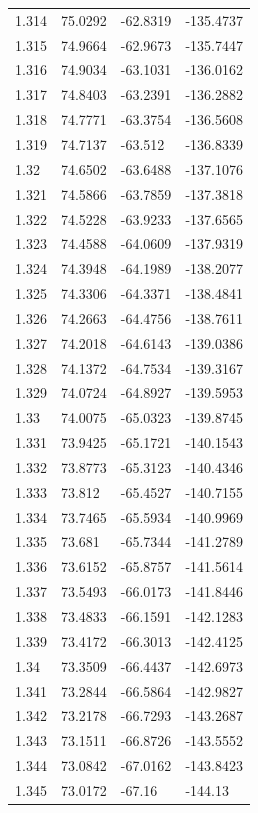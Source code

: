 \begin{tabular}{llll}
1.314 & 75.0292 & -62.8319 & -135.4737 \\
1.315 & 74.9664 & -62.9673 & -135.7447 \\
1.316 & 74.9034 & -63.1031 & -136.0162 \\
1.317 & 74.8403 & -63.2391 & -136.2882 \\
1.318 & 74.7771 & -63.3754 & -136.5608 \\
1.319 & 74.7137 & -63.512 & -136.8339 \\
1.32 & 74.6502 & -63.6488 & -137.1076 \\
1.321 & 74.5866 & -63.7859 & -137.3818 \\
1.322 & 74.5228 & -63.9233 & -137.6565 \\
1.323 & 74.4588 & -64.0609 & -137.9319 \\
1.324 & 74.3948 & -64.1989 & -138.2077 \\
1.325 & 74.3306 & -64.3371 & -138.4841 \\
1.326 & 74.2663 & -64.4756 & -138.7611 \\
1.327 & 74.2018 & -64.6143 & -139.0386 \\
1.328 & 74.1372 & -64.7534 & -139.3167 \\
1.329 & 74.0724 & -64.8927 & -139.5953 \\
1.33 & 74.0075 & -65.0323 & -139.8745 \\
1.331 & 73.9425 & -65.1721 & -140.1543 \\
1.332 & 73.8773 & -65.3123 & -140.4346 \\
1.333 & 73.812 & -65.4527 & -140.7155 \\
1.334 & 73.7465 & -65.5934 & -140.9969 \\
1.335 & 73.681 & -65.7344 & -141.2789 \\
1.336 & 73.6152 & -65.8757 & -141.5614 \\
1.337 & 73.5493 & -66.0173 & -141.8446 \\
1.338 & 73.4833 & -66.1591 & -142.1283 \\
1.339 & 73.4172 & -66.3013 & -142.4125 \\
1.34 & 73.3509 & -66.4437 & -142.6973 \\
1.341 & 73.2844 & -66.5864 & -142.9827 \\
1.342 & 73.2178 & -66.7293 & -143.2687 \\
1.343 & 73.1511 & -66.8726 & -143.5552 \\
1.344 & 73.0842 & -67.0162 & -143.8423 \\
1.345 & 73.0172 & -67.16 & -144.13 \\

\end{tabular}
